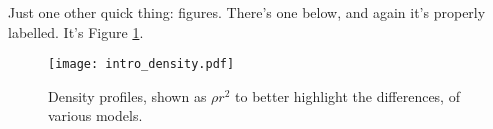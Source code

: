 Just one other quick thing:  figures.  There's one below, and again it's properly labelled.  It's Figure \ref{fig:intro_density}.

\begin{figure}
\begin{center}
	\texttt{[image: intro\_density.pdf]}
\end{center}
	\caption[Density profiles of various models]{Density profiles, shown as $\rho r^2$ to better highlight the differences, of various models.  }
	\label{fig:intro_density}
\end{figure}